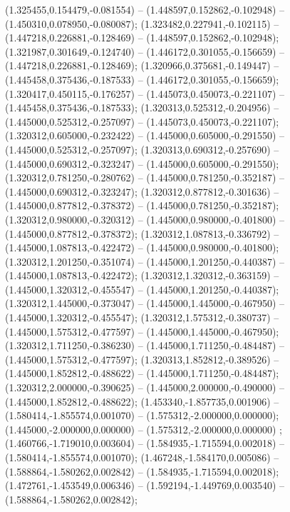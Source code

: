  (1.325455,0.154479,-0.081554) -- (1.448597,0.152862,-0.102948) -- (1.450310,0.078950,-0.080087);
 (1.323482,0.227941,-0.102115) -- (1.447218,0.226881,-0.128469) -- (1.448597,0.152862,-0.102948);
 (1.321987,0.301649,-0.124740) -- (1.446172,0.301055,-0.156659) -- (1.447218,0.226881,-0.128469);
 (1.320966,0.375681,-0.149447) -- (1.445458,0.375436,-0.187533) -- (1.446172,0.301055,-0.156659);
 (1.320417,0.450115,-0.176257) -- (1.445073,0.450073,-0.221107) -- (1.445458,0.375436,-0.187533);
 (1.320313,0.525312,-0.204956) -- (1.445000,0.525312,-0.257097) -- (1.445073,0.450073,-0.221107);
 (1.320312,0.605000,-0.232422) -- (1.445000,0.605000,-0.291550) -- (1.445000,0.525312,-0.257097);
 (1.320313,0.690312,-0.257690) -- (1.445000,0.690312,-0.323247) -- (1.445000,0.605000,-0.291550);
 (1.320312,0.781250,-0.280762) -- (1.445000,0.781250,-0.352187) -- (1.445000,0.690312,-0.323247);
 (1.320312,0.877812,-0.301636) -- (1.445000,0.877812,-0.378372) -- (1.445000,0.781250,-0.352187);
 (1.320312,0.980000,-0.320312) -- (1.445000,0.980000,-0.401800) -- (1.445000,0.877812,-0.378372);
 (1.320312,1.087813,-0.336792) -- (1.445000,1.087813,-0.422472) -- (1.445000,0.980000,-0.401800);
 (1.320312,1.201250,-0.351074) -- (1.445000,1.201250,-0.440387) -- (1.445000,1.087813,-0.422472);
 (1.320312,1.320312,-0.363159) -- (1.445000,1.320312,-0.455547) -- (1.445000,1.201250,-0.440387);
 (1.320312,1.445000,-0.373047) -- (1.445000,1.445000,-0.467950) -- (1.445000,1.320312,-0.455547);
 (1.320312,1.575312,-0.380737) -- (1.445000,1.575312,-0.477597) -- (1.445000,1.445000,-0.467950);
 (1.320312,1.711250,-0.386230) -- (1.445000,1.711250,-0.484487) -- (1.445000,1.575312,-0.477597);
 (1.320313,1.852812,-0.389526) -- (1.445000,1.852812,-0.488622) -- (1.445000,1.711250,-0.484487);
 (1.320312,2.000000,-0.390625) -- (1.445000,2.000000,-0.490000) -- (1.445000,1.852812,-0.488622);
 (1.453340,-1.857735,0.001906) -- (1.580414,-1.855574,0.001070) -- (1.575312,-2.000000,0.000000);
 (1.445000,-2.000000,0.000000) -- (1.575312,-2.000000,0.000000) ;
 (1.460766,-1.719010,0.003604) -- (1.584935,-1.715594,0.002018) -- (1.580414,-1.855574,0.001070);
 (1.467248,-1.584170,0.005086) -- (1.588864,-1.580262,0.002842) -- (1.584935,-1.715594,0.002018);
 (1.472761,-1.453549,0.006346) -- (1.592194,-1.449769,0.003540) -- (1.588864,-1.580262,0.002842);
